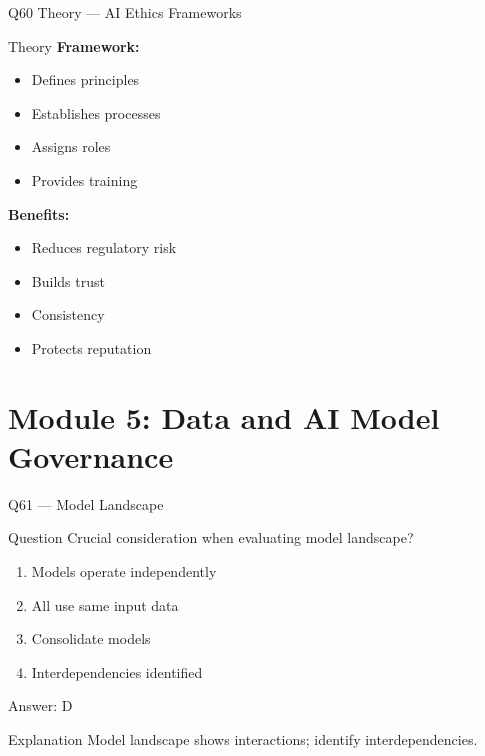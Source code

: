 \documentclass[aspectratio=169,8pt]{beamer}
\begin{document}
	\begin{frame}{Q60 Theory --- AI Ethics Frameworks}
		\begin{block}{Theory}
			\textbf{Framework:}
			\begin{itemize}
				\item Defines principles
				\item Establishes processes
				\item Assigns roles
				\item Provides training
			\end{itemize}
			\textbf{Benefits:}
			\begin{itemize}
				\item Reduces regulatory risk
				\item Builds trust
				\item Consistency
				\item Protects reputation
			\end{itemize}
		\end{block}
	\end{frame}
	
	\section{Module 5: Data and AI Model Governance}
	
	\begin{frame}{Q61 --- Model Landscape}
		\begin{block}{Question}
			Crucial consideration when evaluating model landscape?
		\end{block}
		\begin{enumerate}[label=\Alph*.]
			\item Models operate independently
			\item All use same input data
			\item Consolidate models
			\item Interdependencies identified
		\end{enumerate}
		\begin{exampleblock}{Answer: D}
		\end{exampleblock}
		\begin{block}{Explanation}
			Model landscape shows interactions; identify interdependencies.
		\end{block}
	\end{frame}
	
\end{document}
